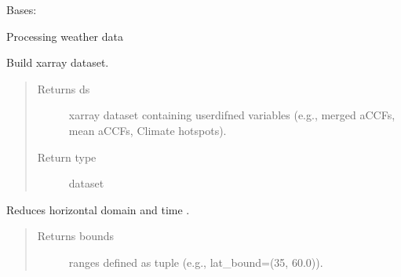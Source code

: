 \documentclass[a4paper,11pt,english]{sphinxmanual}
\begin{document}
\begin{fulllineitems}
\label{\detokenize{envlib:envlib.weather_store.WeatherStore}}
Bases: {\hyperref[\detokenize{envlib:envlib.weather_store.WeatherStore_}]{}}

Processing weather data

\begin{fulllineitems}
\label{\detokenize{envlib:envlib.weather_store.WeatherStore.axes}}
\end{fulllineitems}


\begin{fulllineitems}
\label{\detokenize{envlib:envlib.weather_store.WeatherStore.get_xarray}}
Build xarray dataset.
\begin{quote}\begin{description}
\item[{Returns ds}] \leavevmode
xarray dataset containing user\sphinxhyphen{}difned variables (e.g., merged aCCFs, mean aCCFs, Climate hotspots).

\item[{Return type}] \leavevmode
dataset

\end{description}\end{quote}

\end{fulllineitems}


\begin{fulllineitems}
\label{\detokenize{envlib:envlib.weather_store.WeatherStore.reduce_domain}}
Reduces horizontal domain and time .
\begin{quote}\begin{description}
\item[{Returns bounds}] \leavevmode
ranges defined as tuple (e.g., lat\_bound=(35, 60.0)).


\end{description}
\end{quote}
\end{fulllineitems}
\end{fulllineitems}
\end{document}
